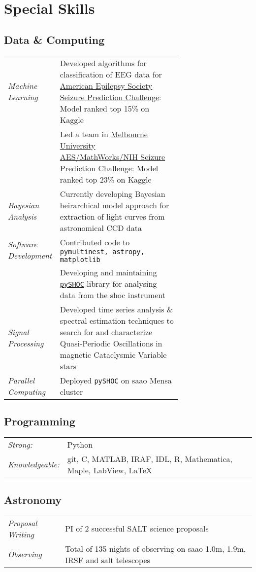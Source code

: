\documentclass{article}
\newcommand{\tb}{\textbullet}
\newcommand{\skill}[2]{%
  \hspace{10pt}\tb\hspace{10pt} \emph{#1} & #2					\\
  }
\newcommand{\saao}{\gls*{saao}\xspace}
\newcommand{\salt}{\acrshort*{salt}\xspace}
\newcommand{\shoc}{\gls*{shoc}\xspace}
\begin{document}
\section{Special Skills}

\subsection*{Data \& Computing}
  \begin{tabular}{l p{0.7\linewidth}}
    \skill{Machine Learning}{Developed algorithms for classification of EEG data for \href{https://www.kaggle.com/c/seizure-prediction}{American Epilepsy Society Seizure Prediction Challenge}: Model ranked top 15\% on Kaggle}
     &			    {Led a team in \href{https://www.kaggle.com/c/melbourne-university-seizure-prediction}{Melbourne University AES/MathWorks/NIH Seizure Prediction Challenge}: Model ranked top 23\% on Kaggle}	\\
    \skill{Bayesian Analysis}{Currently developing Bayesian heirarchical model approach for extraction of light curves from astronomical CCD data}
    \skill{Software Development}{Contributed code to {\tt pymultinest, astropy, matplotlib}}
    &				 Developing and maintaining \href{https://github.com/astromancer/pySHOC}{\tt pySHOC} library for analysing data from the \shoc instrument \\
    \skill{Signal Processing}{Developed time series analysis \& spectral estimation techniques to search for and characterize Quasi-Periodic Oscillations in magnetic Cataclysmic Variable stars}
    \skill{Parallel Computing}{Deployed {\tt pySHOC} on \saao Mensa cluster}
  \end{tabular}
% 

 \subsection*{Programming}
  \begin{tabular}{l l}
    \skill{Strong:}{Python}
    \skill{Knowledgeable:}{git, C, MATLAB, IRAF, IDL, R, Mathematica, Maple, LabView, \LaTeX}
  \end{tabular}

  
  \subsection*{Astronomy}
    \begin{tabular}{l l}
      \skill{Proposal Writing}{PI of 2 successful SALT science proposals}
      \skill{Observing}{Total of 135 nights of observing on \saao 1.0m, 1.9m, IRSF and \salt telescopes}
    \end{tabular}
\end{document}
